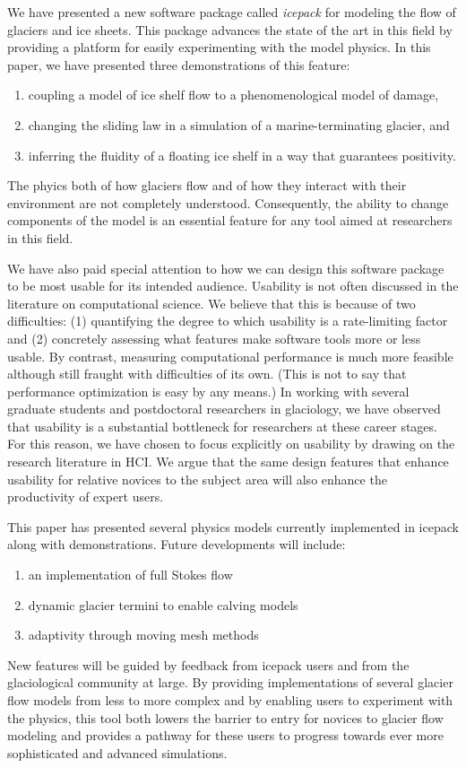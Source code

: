 \documentclass[journal abbreviation, manuscript]{copernicus}
\begin{document}
\conclusions  %

We have presented a new software package called \emph{icepack} for modeling the flow of glaciers and ice sheets.
This package advances the state of the art in this field by providing a platform for easily experimenting with the model physics.
In this paper, we have presented three demonstrations of this feature:
\begin{enumerate}
    \item coupling a model of ice shelf flow to a phenomenological model of damage,
    \item changing the sliding law in a simulation of a marine-terminating glacier, and
    \item inferring the fluidity of a floating ice shelf in a way that guarantees positivity.
\end{enumerate}
The phyics both of how glaciers flow and of how they interact with their environment are not completely understood.
Consequently, the ability to change components of the model is an essential feature for any tool aimed at researchers in this field.

We have also paid special attention to how we can design this software package to be most usable for its intended audience.
Usability is not often discussed in the literature on computational science.
We believe that this is because of two difficulties: (1) quantifying the degree to which usability is a rate-limiting factor and (2) concretely assessing what features make software tools more or less usable.
By contrast, measuring computational performance is much more feasible although still fraught with difficulties of its own.
(This is not to say that performance optimization is easy by any means.)
In working with several graduate students and postdoctoral researchers in glaciology, we have observed that usability is a substantial bottleneck for researchers at these career stages.
For this reason, we have chosen to focus explicitly on usability by drawing on the research literature in HCI.
We argue that the same design features that enhance usability for relative novices to the subject area will also enhance the productivity of expert users.

This paper has presented several physics models currently implemented in icepack along with demonstrations.
Future developments will include:
\begin{enumerate}
    \item an implementation of full Stokes flow
    \item dynamic glacier termini to enable calving models
    \item adaptivity through moving mesh methods
\end{enumerate}
New features will be guided by feedback from icepack users and from the glaciological community at large.
By providing implementations of several glacier flow models from less to more complex and by enabling users to experiment with the physics, this tool both lowers the barrier to entry for novices to glacier flow modeling and provides a pathway for these users to progress towards ever more sophisticated and advanced simulations.
\end{document}
